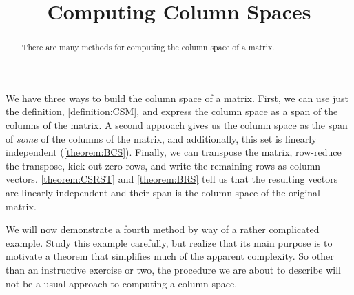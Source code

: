 \documentclass{ximera}
\title{Computing Column Spaces}
\begin{document}
\begin{abstract}
  There are many methods for computing the column space of a matrix.
\end{abstract}
\maketitle

We have three ways to build the column space of a matrix.  First, we
can use just the definition, \ref{definition:CSM}, and express the
column space as a span of the columns of the matrix.  A second
approach gives us the column space as the span of \textit{some} of the
columns of the matrix, and additionally, this set is linearly
independent (\ref{theorem:BCS}).  Finally, we can transpose the
matrix, row-reduce the transpose, kick out zero rows, and write the
remaining rows as column vectors.  \ref{theorem:CSRST} and
\ref{theorem:BRS} tell us that the resulting vectors are linearly
independent and their span is the column space of the original matrix.

We will now demonstrate a fourth method by way of a rather complicated
example.  Study this example carefully, but realize that its main
purpose is to motivate a theorem that simplifies much of the apparent
complexity.  So other than an instructive exercise or two, the
procedure we are about to describe will not be a usual approach to
computing a column space.
\end{document}
